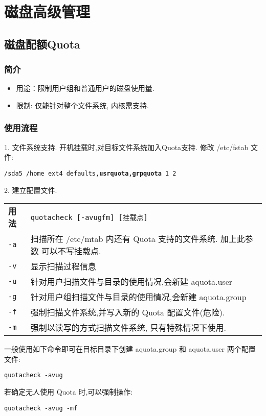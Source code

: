 \section{磁盘高级管理}

\subsection{磁盘配额Quota}
\subsubsection{简介}
\begin{itemize}
    \item 用途：限制用户组和普通用户的磁盘使用量.

    \item 限制: 仅能针对整个文件系统, 内核需支持.
\end{itemize}

\subsubsection{使用流程}
\par
1. 文件系统支持. 开机挂载时,对目标文件系统加入Quota支持. 修改 /etc/fstab 文件:\\
\parbox{\textwidth}{\qquad \texttt{/sda5 /home ext4 defaults,\textbf{usrquota,grpquota} 1 2}}

\par
2. 建立配置文件.
\begin{longtable}{l@{ : }p{}}\hline\hline

    \textbf{用法} & \verb"quotacheck [-avugfm] [挂载点]"  \\

    \texttt{-a} & 扫描所在 /etc/mtab 内还有 Quota 支持的文件系统. 加上此参数%
    可以不写挂载点.\\

    \texttt{-v} & 显示扫描过程信息 \\

    \texttt{-u} & 针对用户扫描文件与目录的使用情况,会新建 aquota.user\\

    \texttt{-g} & 针对用户组扫描文件与目录的使用情况,会新建 aquota.group \\

    \texttt{-f} & 强制扫描文件系统,并写入新的 Quota 配置文件(危险). \\

    \texttt{-m} & 强制以读写的方式扫描文件系统, 只有特殊情况下使用.\\

    \hline
\end{longtable}
一般使用如下命令即可在目标目录下创建 aquota.group 和 aquota.user 两个配置文件:\\
\parbox{\textwidth}{\qquad \texttt{quotacheck -avug}}
若确定无人使用 Quota 时,可以强制操作:\\
\parbox{\textwidth}{\qquad \texttt{quotacheck -avug -mf}}

